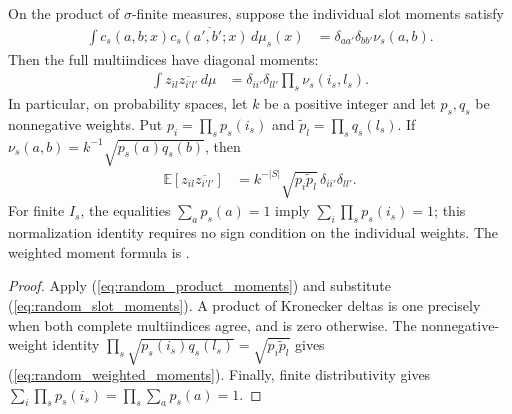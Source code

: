 \begin{theorem}\label{thm:random_tensor_moments}
    \leanok
    On the product of $\sigma$-finite measures, suppose the individual slot
    moments satisfy
    \begin{align}
        \int c_s(a,b;x)\overline{c_s(a',b';x)}\,d\mu_s(x)
         & =\delta_{aa'}\delta_{bb'}\nu_s(a,b).
        \label{eq:random_slot_moments}
    \end{align}
    Then the full multiindices have diagonal moments:
    \begin{align}
        \int z_{il}\overline{z_{i'l'}}\,d\mu
         & =\delta_{ii'}\delta_{ll'}\prod_s\nu_s(i_s,l_s).
        \label{eq:random_tensor_moments}
    \end{align}
    In particular, on probability spaces, let $k$ be a positive integer and
    let $p_s,q_s$ be nonnegative weights. Put
    $p_i=\prod_s p_s(i_s)$ and $\widetilde p_l=\prod_s q_s(l_s)$. If
    $\nu_s(a,b)=k^{-1}\sqrt{p_s(a)q_s(b)}$, then
    \begin{align}
        \mathbb E[z_{il}\overline{z_{i'l'}}]
         & =k^{-|S|}\sqrt{p_i\widetilde p_l}\,
        \delta_{ii'}\delta_{ll'}.
        \label{eq:random_weighted_moments}
    \end{align}
    For finite $I_s$, the equalities $\sum_a p_s(a)=1$ imply
    $\sum_i\prod_s p_s(i_s)=1$; this normalization identity requires no sign
    condition on the individual weights.
    The weighted moment formula is
    \cite[Equation~(5.11)]{OpenAI2026PolynomialPEPS}.
\end{theorem}

\begin{proof}\leanok
    Apply (\ref{eq:random_product_moments}) and substitute
    (\ref{eq:random_slot_moments}). A product of Kronecker deltas is one
    precisely when both complete multiindices agree, and is zero otherwise.
    The nonnegative-weight identity
    $\prod_s\sqrt{p_s(i_s)q_s(l_s)}=\sqrt{p_i\widetilde p_l}$
    gives (\ref{eq:random_weighted_moments}). Finally, finite distributivity
    gives $\sum_i\prod_s p_s(i_s)=\prod_s\sum_a p_s(a)=1$.
\end{proof}

